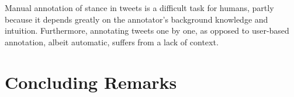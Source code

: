 \documentclass[10pt, a4paper]{article}
\begin{document}
Manual annotation of stance in tweets is a difficult task for humans, partly because it depends greatly on the annotator's background knowledge and intuition. Furthermore, annotating tweets one by one, as opposed to user-based annotation, albeit automatic, suffers from a lack of context.







\section{Concluding Remarks}\label{sec:concluding-remarks}
\end{document}
